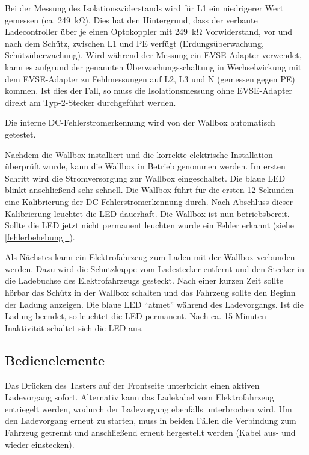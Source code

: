 \documentclass[a4paper,10pt]{article}
\newcommand*{\fullref}[1]{\hyperref[{#1}]{\ref*{#1}~\nameref*{#1}}}
\begin{document}
\begin{multicols*}{2}
	Bei der Messung des Isolationswiderstands wird für L1 ein niedrigerer Wert
	gemessen (ca. \SI{249}{\kilo\ohm}). Dies hat den Hintergrund, dass
	der verbaute Ladecontroller über je einen Optokoppler mit
	\SI{249}{\kilo\ohm} Vorwiderstand, vor und nach dem Schütz, zwischen L1 und
	PE verfügt (Erdungsüberwachung, Schützüberwachung). Wird während der Messung ein EVSE-Adapter verwendet,
	kann es aufgrund der genannten Überwachungsschaltung in Wechselwirkung mit dem EVSE-Adapter zu Fehlmessungen
	auf L2, L3 und N (gemessen gegen PE) kommen. Ist dies der Fall, so muss die Isolationsmessung
	ohne EVSE-Adapter direkt am Typ-2-Stecker durchgeführt werden.

	Die interne DC-Fehlerstromerkennung wird von der Wallbox automatisch getestet.

	Nachdem die Wallbox installiert
	und die korrekte elektrische Installation überprüft wurde, kann die Wallbox in
	Betrieb genommen werden.
	Im ersten Schritt wird die Stromversorgung zur Wallbox eingeschaltet. Die
	blaue LED blinkt anschließend sehr schnell. Die Wallbox führt
	für die ersten 12 Sekunden eine Kalibrierung der
	DC-Fehlerstromerkennung durch. Nach Abschluss dieser Kalibrierung
	leuchtet die LED dauerhaft. Die Wallbox ist nun betriebsbereit. Sollte die LED jetzt
	nicht permanent leuchten wurde ein Fehler erkannt (siehe \fullref{fehlerbehebung}).

	Als Nächstes kann ein Elektrofahrzeug zum Laden mit der Wallbox verbunden
	werden. Dazu wird die Schutzkappe vom Ladestecker entfernt und den Stecker in die
	Ladebuchse des Elektrofahrzeugs gesteckt. Nach einer kurzen Zeit sollte hörbar
	das Schütz in der Wallbox schalten und das Fahrzeug sollte den Beginn
	der Ladung anzeigen. Die blaue LED \enquote{atmet} während des
	Ladevorgangs. Ist die Ladung beendet, so leuchtet die LED permanent. Nach ca.
	15 Minuten Inaktivität schaltet sich die LED aus.

	\subsection{Bedienelemente}\label{lockswitch}
	Das Drücken des Tasters auf der Frontseite unterbricht einen aktiven Ladevorgang
	sofort. Alternativ kann das Ladekabel vom Elektrofahrzeug entriegelt werden,
	wodurch der Ladevorgang ebenfalls unterbrochen wird. Um den Ladevorgang erneut
	zu starten, muss in beiden Fällen die Verbindung zum Fahrzeug getrennt und
	anschließend erneut hergestellt werden (Kabel aus- und wieder einstecken).


\end{multicols*}
\end{document}
